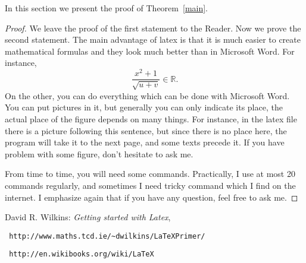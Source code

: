 \documentclass[12pt,a4paper]{amsart}
\numberwithin{equation}{section}
\theoremstyle{plain}
\theoremstyle{definition}
\begin{document}
In this section we present the proof of Theorem~\ref{main}.

\begin{proof} We leave the proof of the first statement to the Reader. Now we prove the second statement. The main advantage of latex is that it is much easier to create mathematical formulas and they look much better than in Microsoft Word.
For instance,
$$\frac{x^2+1}{\sqrt{u+v}}\in \mathbb{R}.$$
On the other, you can do everything which can be done with Microsoft Word. You can put pictures in it, but generally you can only indicate its place, the actual place of the figure depends on many things. For instance, in the latex file there is a picture following this sentence, but since there is no place here, the program will take it to the next page, and some texts precede it. If you have problem with some figure, don't hesitate to ask me.

\begin{figure}[h!]
\end{figure}

From time to time, you will need some commands. Practically, I use at most 20 commands regularly, and sometimes I need tricky command which I find on the internet. I emphasize again that if you have any question, feel free to ask me.

\end{proof}

\begin{thebibliography}{99} 

 David R. Wilkins: \textit{Getting started with Latex}, \begin{verbatim} http://www.maths.tcd.ie/~dwilkins/LaTeXPrimer/
\end{verbatim}

 \begin{verbatim} http://en.wikibooks.org/wiki/LaTeX \end{verbatim}



\end{thebibliography}
\end{document}
